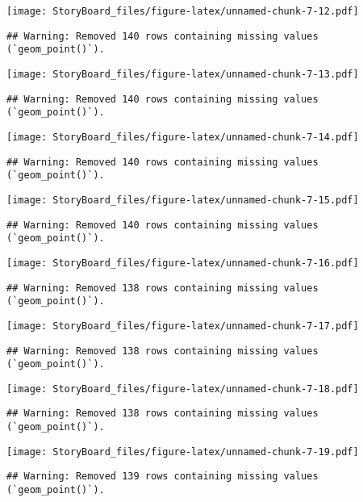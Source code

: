 \documentclass[
]{article}
\begin{document}
\texttt{[image: StoryBoard\_files/figure-latex/unnamed-chunk-7-12.pdf]}

\begin{verbatim}
## Warning: Removed 140 rows containing missing values (`geom_point()`).
\end{verbatim}

\texttt{[image: StoryBoard\_files/figure-latex/unnamed-chunk-7-13.pdf]}

\begin{verbatim}
## Warning: Removed 140 rows containing missing values (`geom_point()`).
\end{verbatim}

\texttt{[image: StoryBoard\_files/figure-latex/unnamed-chunk-7-14.pdf]}

\begin{verbatim}
## Warning: Removed 140 rows containing missing values (`geom_point()`).
\end{verbatim}

\texttt{[image: StoryBoard\_files/figure-latex/unnamed-chunk-7-15.pdf]}

\begin{verbatim}
## Warning: Removed 140 rows containing missing values (`geom_point()`).
\end{verbatim}

\texttt{[image: StoryBoard\_files/figure-latex/unnamed-chunk-7-16.pdf]}

\begin{verbatim}
## Warning: Removed 138 rows containing missing values (`geom_point()`).
\end{verbatim}

\texttt{[image: StoryBoard\_files/figure-latex/unnamed-chunk-7-17.pdf]}

\begin{verbatim}
## Warning: Removed 138 rows containing missing values (`geom_point()`).
\end{verbatim}

\texttt{[image: StoryBoard\_files/figure-latex/unnamed-chunk-7-18.pdf]}

\begin{verbatim}
## Warning: Removed 138 rows containing missing values (`geom_point()`).
\end{verbatim}

\texttt{[image: StoryBoard\_files/figure-latex/unnamed-chunk-7-19.pdf]}

\begin{verbatim}
## Warning: Removed 139 rows containing missing values (`geom_point()`).
\end{verbatim}
\end{document}

